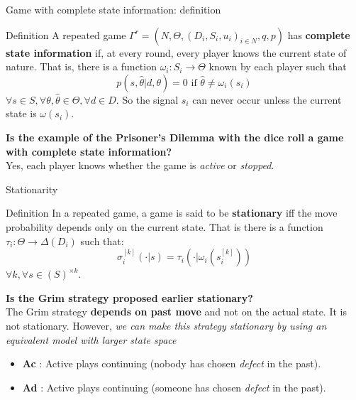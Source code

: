 \begin{frame}{Game with complete state information: definition}
    \begin{block}{Definition}
        A repeated game $\Gamma^r = (N,\Theta, (D_i,S_i,u_i)_{i\in N},q,p)$ has
        \textbf{complete state information} if, at every round, every player knows
        the current state of nature. That is, there is a function
        $\omega_i:S_i \rightarrow \Theta$ known by each player such that
        \begin{equation*}
            p(s,\hat{\theta} | d,\theta) = 0 \text{ if } \hat{\theta} \neq \omega_i(s_i)
        \end{equation*}
        $\forall s \in S, \forall \theta, \hat{\theta} \in \Theta, \forall d \in D$.
        So the signal $s_i$ can never occur unless the current state is $\omega(s_i)$.
    \end{block}

    \pause
    \textbf{{\color{green}Is the example of the Prisoner's Dilemma with the dice roll a game
    with complete state information?}} \\
    \pause
    Yes, each player knows whether the game is \textit{active} or \textit{stopped}.
\end{frame}

\begin{frame}{Stationarity}
    \begin{block}{Definition}
        In a repeated game, a game is said to be \textbf{stationary} iff the move probability
        depends only on the current state. That is there is a function $\tau_i : \Theta
        \rightarrow \Delta(D_i)$ such that:
        \begin{equation*}
	        \sigma_i^{[k]}(\cdot | s) = \tau_i(\cdot | \omega_i(s_i^{[k]}))
        \end{equation*}
        $\forall k, \forall s \in (S)^{\times k}$.
    \end{block}

    \pause
    \textbf{{\color{green}Is the Grim strategy proposed earlier stationary?}} \\
    \pause
    The Grim strategy \textbf{depends on past move} and not on the actual state. It
    is not stationary.
    \pause
    However, \textit{we can make this strategy stationary by using an equivalent model with larger
    state space}
    \begin{itemize}
        \item \textbf{Ac} : Active plays continuing (nobody has chosen \textit{defect} in the past).
        \item \textbf{Ad} : Active plays continuing (someone has chosen \textit{defect} in the past).
    \end{itemize}
\end{frame}

